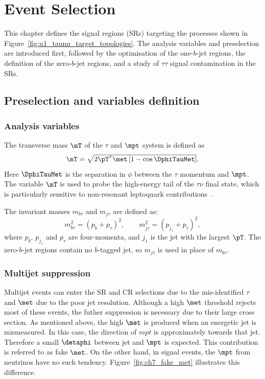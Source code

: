 \chapter{Event Selection}
\label{chapter:event_selection}

This chapter defines the signal regions (SRs) targeting the processes shown in Figure~\ref{fig:u1_taunu_target_topologies}.
The analysis variables and preselection are introduced first, followed by the optimisation of the one-$b$-jet regions, the definition of the zero-$b$-jet regions, and a study of $\tau\tau$ signal contamination in the SRs.

\section{Preselection and variables definition}
\label{sec:ch7_preselection}

\subsection{Analysis variables}
\label{subsec:ch7_variables}

The transverse mass $\mT$ of the $\tau$ and $\mpt$ system is defined as
    \begin{equation}
        \mT = \sqrt{2\pT^\tau\met\left[1-\cos\DphiTauMet\right]}.
        \label{eq:ch7_mt}
    \end{equation}
Here $\DphiTauMet$ is the separation in $\phi$ between the $\tau$ momentum and $\mpt$.
The variable $\mT$ is used to probe the high-energy tail of the $\tau\nu$ final state, which is particularly sensitive to non-resonant leptoquark contributions~\cite{Endo2022NonResonant}.

The invariant masses $m_{b\tau}$ and $m_{j\tau}$ are defined as:
    \begin{equation}
        m_{b\tau}^{2} = (p_b+p_\tau)^2, \qquad m_{j\tau}^{2} = (p_{j_1}+p_\tau)^2,
        \label{eq:ch7_visible_masses}
    \end{equation}
    where $p_b$, $p_{j_1}$ and $p_\tau$ are four-momenta, and $j_1$ is the jet with the largest $\pT$.
The zero-$b$-jet regions contain no $b$-tagged jet, so $m_{j\tau}$ is used in place of $m_{b\tau}$.

\subsection{Multijet suppression}
\label{subsec:ch7_multijet}

Multijet events can enter the SR and CR selections due to the mis-identified $\tau$ and $\met$ due to the poor jet resolution.
Although a high $\met$ threshold rejects most of these events, the futher suppression is necessary due to their large cross section.
As mentioned above, the high $\met$ is produced when an energetic jet is mismeasured. In this case, the direction of $mpt$ is approximately towards that jet. Therefore a small $\detaphi$ between jet and $\mpt$ is expected.
This contribution is referred to as fake $\met$. On the other hand, in signal events, the $\mpt$ from neutrinos have no such tendency.
Figure~\ref{fig:ch7_fake_met} illustrates this difference.

